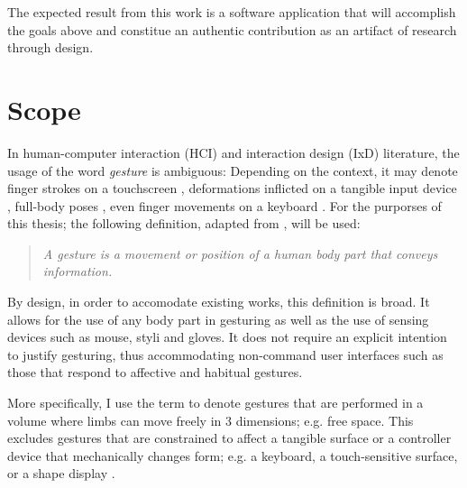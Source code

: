 The expected result from this work is a software application that will accomplish the goals above and constitue an authentic contribution as an artifact of research through design.

\section{Scope}
\label{sec:scope}

In human-computer interaction (HCI) and interaction design (IxD) literature, the usage of the word \emph{gesture} is ambiguous: Depending on the context, it may denote finger strokes on a touchscreen \parencite{Lu:2013}, deformations inflicted on a tangible input device \parencite{Warren:2013}, full-body poses \parencite{Walter:2013}, even finger movements on a keyboard \parencite{Zhang:2014}. For the purporses of this thesis; the following definition, adapted from \textcite{Kurtenbach:1990}, will be used:

\begin{quote}
\emph{A gesture is a movement or position of a human body part that conveys information.}
\end{quote}

By design, in order to accomodate existing works, this definition is broad. It allows for the use of any body part in gesturing as well as the use of sensing devices such as mouse, styli and gloves. It does not require an explicit intention to justify gesturing, thus accommodating non-command user interfaces \parencite{Nielsen:1993} such as those that respond to affective \parencite{Kapur:2005} and habitual \parencite{Liu:2009} gestures.

More specifically, I use the term  to denote gestures that are performed in a volume where limbs can move freely in 3 dimensions; e.g. free space. This excludes gestures that are constrained to affect a tangible surface or a controller device that mechanically changes form; e.g. a keyboard, a touch-sensitive surface, or a shape display \parencite{Follmer:2013}.

